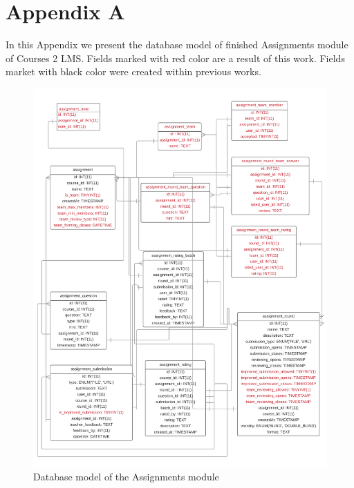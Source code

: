 
\chapter{Appendix A}

In this Appendix we present the database model of finished Assignments module of Courses 2 LMS. Fields marked with red color are a result of this work. Fields market with black color were created within previous works.

\begin{figure}[h]
    \centering
    \includegraphics[width=\textwidth]{images/database.png}
    \caption*{Database model of the Assignments module}
\end{figure}
